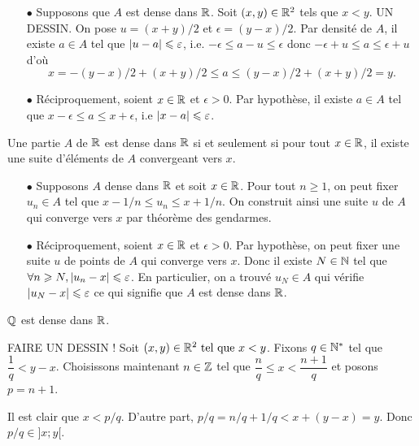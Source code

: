 \documentclass{magnolia}
\begin{document}
  \begin{sol}
  \begin{itemize}
  \item[$\bullet$] Supposons que $A$ est dense dans $\mathbb{R}$. Soit $(x,y)\in \mathbb{R}^2$ tels que $x<y$. UN DESSIN. On pose $u=(x+y)/2$ et $\epsilon=(y-x)/2$. Par densité de $A$, il existe $a\in A$ tel que $\left|u-a\right|\leqslant \varepsilon$, i.e. $-\epsilon \leq a-u\leq \epsilon$ donc $-\epsilon+u \leq a \leq \epsilon+u$ d'où $$x=-(y-x)/2+(x+y)/2 \leq a \leq (y-x)/2+(x+y)/2=y.$$
  \item[$\bullet$] Réciproquement, soient $x\in \mathbb{R}$ et $\epsilon>0$. Par hypothèse, il existe $a\in A$ tel que $x-\epsilon\leq a \leq x+\epsilon$, i.e $\left|x-a\right|\leqslant \varepsilon$.
  \end{itemize}
  
  \end{sol}
  
  \begin{proposition}[utile=-3]
  Une partie $A$ de $\mathbb{R}$ est dense dans $\mathbb{R}$ si et seulement si pour tout $x\in\mathbb{R}$, il existe
  une suite d'éléments de $A$ convergeant vers $x$.
  \end{proposition}
  
  \begin{preuve}
  \begin{itemize}
  \item[$\bullet$] Supposons $A$ dense dans $\mathbb{R}$ et soit $x\in \mathbb{R}$. Pour tout $n\geq 1$, on peut fixer $u_n \in A$ tel que $x-1/n\leq u_n\leq x+1/n$. On construit ainsi une suite $u$ de $A$ qui converge vers $x$ par théorème des gendarmes.
  \item[$\bullet$] Réciproquement, soient $x\in \mathbb{R}$ et $\epsilon>0$.
  Par hypothèse, on peut fixer une suite $u$ de points de $A$ qui converge vers $x$. Donc il existe $N\in \mathbb{N}$ tel que $\forall n\geqslant N, \left|u_n-x\right|\leqslant \varepsilon$. En particulier, on a trouvé $u_N \in A$ qui vérifie $\left|u_N-x\right|\leqslant \varepsilon$ ce qui signifie que $A$ est dense dans $\mathbb{R}$.
  \end{itemize}
  \end{preuve}
  
  \begin{proposition}[utile=-3]
  $\mathbb{Q}$ est dense dans $\mathbb{R}$.
  \end{proposition}
  
  \begin{preuve}
  FAIRE UN DESSIN ! Soit $(x,y)\in \mathbb{R}^2 \text{ tel que } x<y$. Fixons $q\in {\mathbb{N}^*}$ tel que $\dfrac{1}{q}<y-x$. Choisissons maintenant $n\in\mathbb{Z}$ tel que $\dfrac{n}{q}\leq x < \dfrac{n+1}{q}$ et posons $p=n+1$.
  
  Il est clair que $x<p/q$. D'autre part, $p/q=n/q+1/q <x+(y-x)=y$. Donc $p/q\in ]x;y[$.
  \end{preuve}
  
\end{document}
